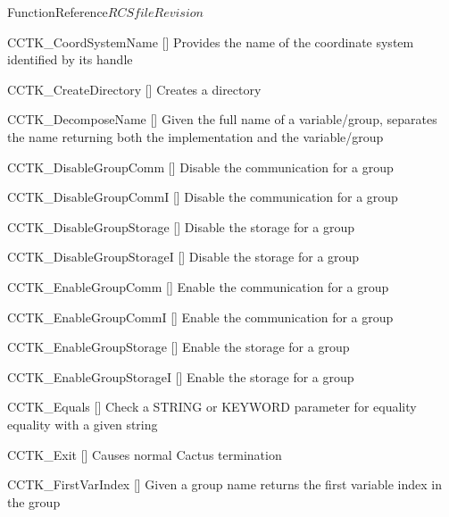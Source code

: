 \begin{cactuspart}{FunctionReference}{$RCSfile$}{$Revision$}
\begin{Lentry}
\item[CCTK\_CoordSystemName]
  [\pageref{CCTK-CoordSystemName}]
  Provides the name of the coordinate system identified by its handle

\item[CCTK\_CreateDirectory]
  [\pageref{CCTK-CreateDirectory}]
  Creates a directory

\item[CCTK\_DecomposeName]
  [\pageref{CCTK-DecomposeName}]
  Given the full name of a variable/group, separates the name returning both the implementation and the variable/group

\item[CCTK\_DisableGroupComm]
  [\pageref{CCTK-DisableGroupComm}]
  Disable the communication for a group

\item[CCTK\_DisableGroupCommI]
  [\pageref{CCTK-DisableGroupCommI}]
  Disable the communication for a group

\item[CCTK\_DisableGroupStorage]
  [\pageref{CCTK-DisableGroupStorage}]
  Disable the storage for a group

\item[CCTK\_DisableGroupStorageI]
  [\pageref{CCTK-DisableGroupStorageI}]
  Disable the storage for a group

\item[CCTK\_EnableGroupComm]
  [\pageref{CCTK-EnableGroupComm}]
  Enable the communication for a group

\item[CCTK\_EnableGroupCommI]
  [\pageref{CCTK-EnableGroupComm}]
  Enable the communication for a group

\item[CCTK\_EnableGroupStorage]
  [\pageref{CCTK-EnableGroupStorage}]
  Enable the storage for a group

\item[CCTK\_EnableGroupStorageI]
  [\pageref{CCTK-EnableGroupStorage}]
  Enable the storage for a group

\item[CCTK\_Equals]
  [\pageref{CCTK-Equals}]
  Check a STRING or KEYWORD parameter for equality equality with a given string

\item[CCTK\_Exit]
  [\pageref{CCTK-Exit}]
  Causes normal Cactus termination

\item[CCTK\_FirstVarIndex]
  [\pageref{CCTK-FirstVarIndex}]
  Given a group name returns the first variable index in the group


\end{Lentry}
\end{cactuspart}
